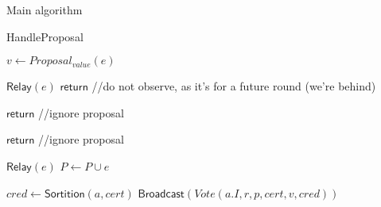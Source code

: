 \documentclass[10pt,a4paper]{article}
\begin{document}
\begin{section}{Main algorithm}
\begin{subsection}{HandleProposal}\label{ssect:handle-proposal}

    \begin{algorithm}[H]
        \caption{\underline{HandleProposal}}
        \label{algo:handle-proposal}
        \begin{algorithmic}[1]

            \State $v \gets Proposal_{value}(e)$

                \State $\mathsf{Relay}(e)$  %
                \State $\mathsf{return}$  //do not observe, as it's for a future round (we're behind)
            \EndIf

                \State $\mathsf{return}$  //ignore proposal
            \EndIf

                \State $\mathsf{return}$ //ignore proposal
            \EndIf

            \State $\mathsf{Relay}(e)$
            \State $P \gets P \cup e$

                    \State $cred \gets 
                    \mathsf{Sortition}(a, cert)$
                        \State $\mathsf{Broadcast}(Vote(a.I, r, p, cert, v,  cred))$
                    \EndIf
                \EndFor    
            \EndIf

        \EndFunction
        \end{algorithmic}
    \end{algorithm}
    

\end{subsection}
\end{section}
\end{document}
